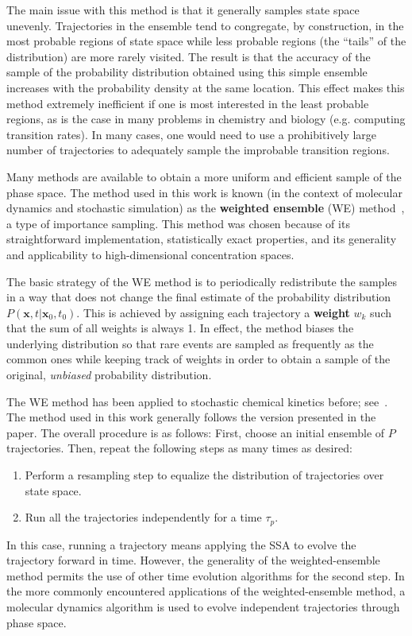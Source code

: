 \documentclass[english,letterpaper,12pt]{report}
\newcommand{\defkeywd}[1]{\textbf{#1}}
\renewcommand{\vec}[1]{\ensuremath{\mathbf{#1}}}
\begin{document}
\begin{doublespacing}
The main issue with this method is that it generally samples state space unevenly. Trajectories in the ensemble tend to congregate, by construction, in the most probable regions of state space while less probable regions (the ``tails'' of the distribution) are more rarely visited. The result is that the accuracy of the sample of the probability distribution obtained using this simple ensemble increases with the probability density at the same location. This effect makes this method extremely inefficient if one is most interested in the least probable regions, as is the case in many problems in chemistry and biology (e.g. computing transition rates).
In many cases,  one would need to use a prohibitively large number of trajectories to adequately sample the improbable transition regions.

Many methods are available to obtain a more uniform and efficient sample of the phase space.  The method used in this work is known (in the context of molecular dynamics and stochastic simulation) as the \defkeywd{weighted ensemble} (WE) method~\cite{we-orig}, a type of importance sampling. This method was chosen because of its straightforward implementation, statistically exact properties, and its generality and applicability to high-dimensional concentration spaces. 

The basic strategy of the WE method is to periodically redistribute the samples in a way that does not change the final estimate of the probability distribution $P(\vec{x}, t | \vec{x}_0, t_0)$. This is achieved by assigning each trajectory a \defkeywd{weight} $w_k$ such that the sum of all weights is always 1. In effect, the method biases the underlying distribution so that rare events are sampled as frequently as the common ones while keeping track of weights in order to obtain a sample of the original, \emph{unbiased} probability distribution.

The WE method has been applied to stochastic chemical kinetics before; see~\cite{we-chemkin}. The method used in this work generally follows the version presented in the paper. The overall procedure is as follows: First, choose an initial ensemble of $P$ trajectories. Then, repeat the following steps as many times as desired:
\begin{enumerate}
    \item Perform a resampling step to equalize the distribution of trajectories over state space.
    \item Run all the trajectories independently for a time $\tau_p$.
\end{enumerate}
In this case, running a trajectory means applying the SSA to evolve the trajectory forward in time. However, the generality of the weighted-ensemble method permits the use of other time evolution algorithms for the second step. In the more commonly encountered applications of the weighted-ensemble method, a molecular dynamics algorithm is used to evolve independent trajectories through phase space.


\end{doublespacing}
\end{document}
